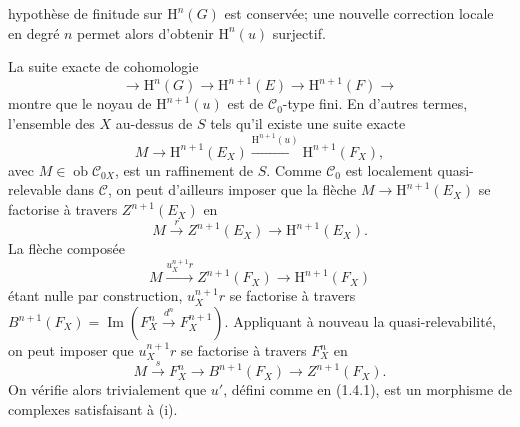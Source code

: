 \documentclass[11pt]{article}
\newcommand{\RRR}{\mathrm{RRR}}
\providecommand{\cC}{\mathcal C}
\providecommand{\Coker}{\operatorname{Coker}}
\providecommand{\Ker}{\operatorname{Ker}}
\providecommand{\cO}{\mathcal O}
\begin{document}
\providecommand{\cS}{\mathcal S}
\providecommand{\cD}{\mathcal D}
\providecommand{\cE}{\mathscr E}
\providecommand{\cG}{\mathscr G}
\providecommand{\cL}{\mathscr L}
\providecommand{\cM}{\mathscr M}
\providecommand{\cP}{\mathscr P}
\providecommand{\cK}{\mathcal K}
\providecommand{\Db}{\mathrm D}
\providecommand{\Kb}{\mathrm K}
\providecommand{\Trc}{\operatorname{Tr}}
\providecommand{\ob}{\operatorname{ob}}
\providecommand{\Coh}{\operatorname{Coh}}
\providecommand{\Cone}{\operatorname{Cone}}
\providecommand{\im}{\operatorname{Im}}
\providecommand{\Id}{\operatorname{Id}}
\providecommand{\RR}{\mathrm{R.R.}}
\providecommand{\RRR}{\mathrm{R.R.R.}}
\providecommand{\GrR}{\mathrm{G}}
\providecommand{\pr}{\operatorname{pr}}
\providecommand{\cC}{\mathcal C}
\providecommand{\cD}{\mathcal D}
\providecommand{\cK}{\mathcal K}
\providecommand{\cO}{\mathcal O}
\providecommand{\cS}{\mathcal S}
\providecommand{\Cpx}{\mathrm C}
\providecommand{\Kpx}{\mathrm K}
\providecommand{\Dpx}{\mathrm D}
\providecommand{\D}{\mathrm D}
\providecommand{\Ho}{\mathrm H}
\providecommand{\RHom}{\mathrm R\!\operatorname{Hom}}
\providecommand{\Ob}{\operatorname{ob}}
\providecommand{\Coker}{\operatorname{Coker}}
\providecommand{\Ker}{\operatorname{Ker}}
\providecommand{\Im}{\operatorname{Im}}
\providecommand{\Hom}{\operatorname{Hom}}
\providecommand{\Cone}{\operatorname{Cone}}
\providecommand{\id}{\operatorname{Id}}
\providecommand{\qis}{\xrightarrow{\sim}}
hypothèse de finitude sur \(\Ho^n(G)\) est conservée; une nouvelle correction locale en degré \(n\) permet alors d'obtenir \(\Ho^n(u)\) surjectif.

La suite exacte de cohomologie
\[
  \longrightarrow \Ho^n(G)\longrightarrow
  \Ho^{n+1}(E)\longrightarrow
  \Ho^{n+1}(F)\longrightarrow
\]
montre que le noyau de \(\Ho^{n+1}(u)\) est de \(\mathcal C_0\)-type fini. En d'autres termes, l'ensemble des \(X\) au-dessus de \(S\) tels qu'il existe une suite exacte
\[
  M\longrightarrow \Ho^{n+1}(E_X)
  \xrightarrow{\Ho^{n+1}(u)}
  \Ho^{n+1}(F_X),
\]
avec \(M\in\Ob\mathcal C_{0X}\), est un raffinement de \(S\). Comme \(\mathcal C_0\) est localement quasi-relevable dans \(\mathcal C\), on peut d'ailleurs imposer que la flèche \(M\longrightarrow \Ho^{n+1}(E_X)\) se factorise à travers \(Z^{n+1}(E_X)\) en
\[
  M\xrightarrow{r}Z^{n+1}(E_X)\longrightarrow \Ho^{n+1}(E_X).
\]
La flèche composée
\[
  M\xrightarrow{u_X^{n+1}r}Z^{n+1}(F_X)\longrightarrow \Ho^{n+1}(F_X)
\]
étant nulle par construction, \(u_X^{n+1}r\) se factorise à travers \(B^{n+1}(F_X)=\operatorname{Im}\!\left(F_X^n\xrightarrow{d^n}F_X^{n+1}\right)\). Appliquant à nouveau la quasi-relevabilité, on peut imposer que \(u_X^{n+1}r\) se factorise à travers \(F_X^n\) en
\[
  M\xrightarrow{s}F_X^n\longrightarrow B^{n+1}(F_X)\longrightarrow Z^{n+1}(F_X).
\]
On vérifie alors trivialement que \(u'\), défini comme en (1.4.1), est un morphisme de complexes satisfaisant à (i).
\end{document}

